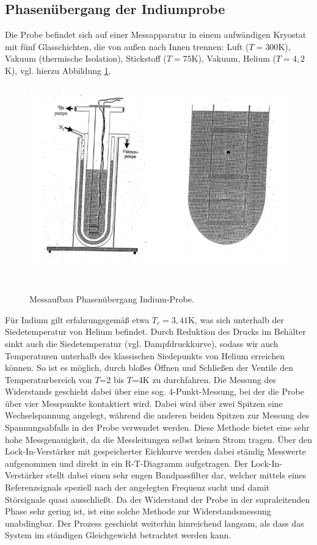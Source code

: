 \subsection{Phasenübergang der Indiumprobe}
Die Probe befindet sich auf einer Messapparatur in einem aufwändigen Kryostat mit fünf Glasschichten, die von außen nach Innen trennen: Luft ($T=300$K), Vakuum (thermische Isolation), Stickstoff ($T=75$K), Vakuum, Helium ($T=4,2$K), vgl. hierzu Abbildung \ref{aufbau}.

\begin{figure}[h!]
	\centering
	\includegraphics[height=8cm]{Aufbau.png}	
	~ %
	\caption{Messaufbau Phasenübergang Indium-Probe. \cite{Anleitung}}
	\label{aufbau}
\end{figure}

Für Indium gilt erfahrungsgemäß etwa $T_c=3,41$K, was sich unterhalb der Siedetemperatur von Helium befindet. Durch Reduktion des Drucks im Behälter sinkt auch die Siedetemperatur (vgl. Dampfdruckkurve), sodass wir auch Temperaturen unterhalb des klassischen Siedepunkts von Helium erreichen können. So ist es möglich, durch bloßes Öffnen und Schließen der Ventile den Temperaturbereich von $T$=2 bis $T$=4K zu durchfahren. Die Messung des Widerstands geschieht dabei über eine sog. 4-Punkt-Messung, bei der die Probe über vier Messpunkte kontaktiert wird. Dabei wird über zwei Spitzen eine Wechselspannung angelegt, während die anderen beiden Spitzen zur Messung des Spannungsabfalls in der Probe verwendet werden. Diese Methode bietet eine sehr hohe Messgenauigkeit, da die Messleitungen selbst keinen Strom tragen. Über den Lock-In-Verstärker mit gespeicherter Eichkurve werden dabei ständig Messwerte aufgenommen und direkt in ein R-T-Diagramm aufgetragen. Der Lock-In-Verstärker stellt dabei einen sehr engen Bandpassfilter dar, welcher mittels eines Referenzsignals speziell nach der angelegten Frequenz sucht und damit Störsignale quasi ausschließt. Da der Widerstand der Probe in der supraleitenden Phase sehr gering ist, ist eine solche Methode zur Widerstandsmessung unabdingbar. Der Prozess geschieht weiterhin hinreichend langsam, als dass das System im ständigen Gleichgewicht betrachtet werden kann.
